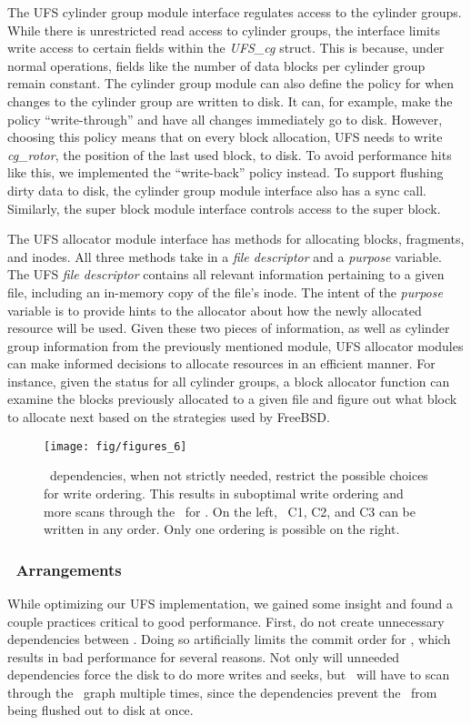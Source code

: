 The UFS cylinder group module interface regulates access to the cylinder
groups. While there is unrestricted read access to cylinder groups, the
interface limits write access to certain fields within the \emph{UFS\_cg}
struct. This is because, under normal operations, fields like the number of
data blocks per cylinder group remain constant. The cylinder group module can
also define the policy for when changes to the cylinder group are written to
disk. It can, for example, make the policy ``write-through'' and have all
changes immediately go to disk. However, choosing this policy means that on
every block allocation, UFS needs to write \emph{cg\_rotor}, the position of
the last used block, to disk. To avoid performance hits like this, we
implemented the ``write-back'' policy instead. To support flushing dirty data
to disk, the cylinder group module interface also has a sync call. Similarly,
the super block module interface controls access to the super block.

The UFS allocator module interface has methods for allocating blocks,
fragments, and inodes. All three methods take in a \emph{file descriptor} and a
\emph{purpose} variable. The UFS \emph{file descriptor} contains all relevant
information pertaining to a given file, including an in-memory copy of the
file's inode. The intent of the \emph{purpose} variable is to provide hints to
the allocator about how the newly allocated resource will be used.  Given these
two pieces of information, as well as cylinder group information from the
previously mentioned module, UFS allocator modules can make informed decisions
to allocate resources in an efficient manner. For instance, given the status
for all cylinder groups, a block allocator function can examine the blocks
previously allocated to a given file and figure out what block to allocate
next based on the strategies used by FreeBSD.

\begin{figure}[htb]
  \centering
  \texttt{[image: fig/figures\_6]}
  \caption{\label{fig:chdescarrange} \Chdesc\ dependencies, when
  not strictly needed, restrict the possible choices for write ordering.
  This results in suboptimal write ordering and more scans through the
  \chdescs\ for \Kudos. On the left, \chdescs\ C1, C2, and C3 can be written
  in any order. Only one ordering is possible on the right.}
\end{figure}

\subsubsection {\ChDesc\ Arrangements}
While optimizing our UFS implementation, we gained some insight and found a
couple practices critical to good performance. First, do not create unnecessary
dependencies between \chdescs. Doing so artificially limits the commit order
for \chdescs, which results in bad performance for several reasons. Not only
will unneeded dependencies force the disk to do more writes and seeks, but
\Kudos\ will have to scan through the \chdesc\ graph multiple times, since the
dependencies prevent the \chdescs\ from being flushed out to disk at once.

